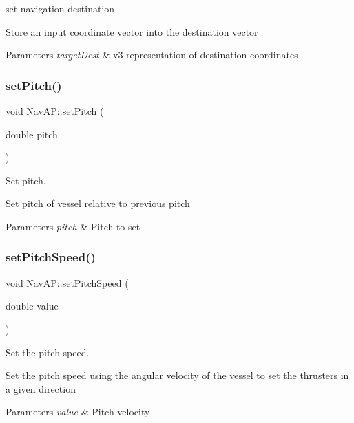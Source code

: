 set navigation destination 

Store an input coordinate vector into the destination vector 
\begin{DoxyParams}{Parameters}
{\em target\+Dest} & v3 representation of destination coordinates \\
\hline
\end{DoxyParams}
\mbox{\label{classNavAP_a57ad1893baffb58fe05f3d6c7113dd7f}} 
\subsubsection{\texorpdfstring{set\+Pitch()}{setPitch()}}
{\footnotesize\ttfamily void Nav\+A\+P\+::set\+Pitch (\begin{DoxyParamCaption}\item[{double}]{pitch }\end{DoxyParamCaption})\hspace{0.3cm}{\ttfamily [private]}}



Set pitch. 

Set pitch of vessel relative to previous pitch 
\begin{DoxyParams}{Parameters}
{\em pitch} & Pitch to set \\
\hline
\end{DoxyParams}
\mbox{\label{classNavAP_ac2b12b7cb72789a30339672b658939c8}} 
\subsubsection{\texorpdfstring{set\+Pitch\+Speed()}{setPitchSpeed()}}
{\footnotesize\ttfamily void Nav\+A\+P\+::set\+Pitch\+Speed (\begin{DoxyParamCaption}\item[{double}]{value }\end{DoxyParamCaption})\hspace{0.3cm}{\ttfamily [private]}}



Set the pitch speed. 

Set the pitch speed using the angular velocity of the vessel to set the thrusters in a given direction 
\begin{DoxyParams}{Parameters}
{\em value} & Pitch velocity \\
\hline
\end{DoxyParams}
\mbox{\label{classNavAP_af1fbe1959b0b1b3929021a11181aa782}} 
